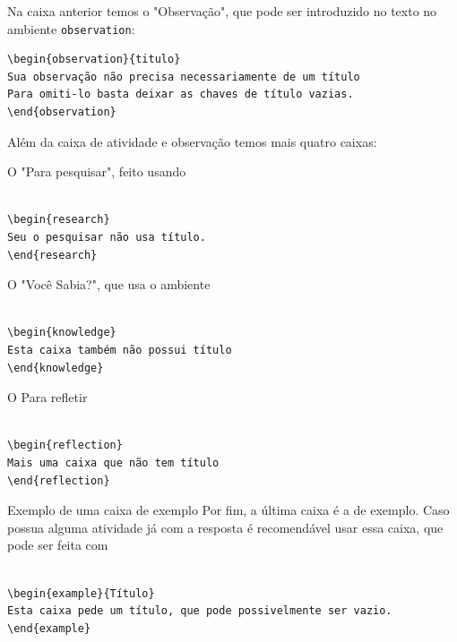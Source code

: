 \clearpage

Na caixa anterior temos o "Observação", que pode ser introduzido no texto no ambiente \verb|observation|:
\begin{verbatim}
\begin{observation}{titulo}
Sua observação não precisa necessariamente de um título
Para omiti-lo basta deixar as chaves de título vazias.
\end{observation}
\end{verbatim}

Além da caixa de atividade e observação temos mais quatro caixas:

\begin{research}
O "Para pesquisar", feito usando

\begin{verbatim}

\begin{research}
Seu o pesquisar não usa título.
\end{research}
\end{verbatim}
\end{research}

\begin{knowledge}
O "Você Sabia?", que usa o ambiente

\begin{verbatim}

\begin{knowledge}
Esta caixa também não possui título
\end{knowledge}
\end{verbatim}
\end{knowledge}

\begin{reflection}
O Para refletir

\begin{verbatim}

\begin{reflection}
Mais uma caixa que não tem título
\end{reflection}
\end{verbatim}
\end{reflection}

\begin{example}{Exemplo de uma caixa de exemplo}
Por fim, a última caixa é a de exemplo. Caso possua alguma atividade já com a resposta é recomendável usar essa caixa, que pode ser feita com
\begin{verbatim}

\begin{example}{Título}
Esta caixa pede um título, que pode possivelmente ser vazio.
\end{example}
\end{verbatim}
\end{example}

